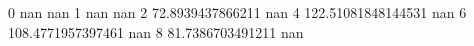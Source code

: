 0 nan nan
1 nan nan
2 72.8939437866211 nan
4 122.51081848144531 nan
6 108.4771957397461 nan
8 81.7386703491211 nan
